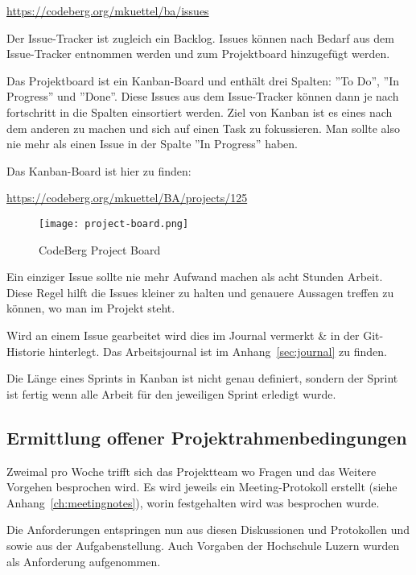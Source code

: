 \url{https://codeberg.org/mkuettel/ba/issues}

Der Issue-Tracker ist zugleich ein Backlog. Issues können nach Bedarf aus dem Issue-Tracker entnommen werden und zum Projektboard hinzugefügt werden.

Das Projektboard ist ein Kanban-Board und enthält drei Spalten: ''To Do'', ''In Progress'' und ''Done''.
Diese Issues aus dem Issue-Tracker können dann je nach fortschritt in die Spalten einsortiert werden. 
Ziel von Kanban ist es eines nach dem anderen zu machen und sich auf einen Task zu fokussieren. Man sollte also nie mehr als einen Issue in der Spalte ''In Progress'' haben.


Das Kanban-Board ist hier zu finden:

\url{https://codeberg.org/mkuettel/BA/projects/125}



\begin{figure*}[ht]
    \texttt{[image: project-board.png]}
    \caption{CodeBerg Project Board}
    \label{fig:projectboard}
\end{figure*}


Ein einziger Issue sollte nie mehr Aufwand machen als acht Stunden Arbeit. Diese Regel hilft die Issues kleiner zu halten und genauere Aussagen treffen zu können, wo man im Projekt steht.

Wird an einem Issue gearbeitet wird dies im Journal vermerkt \& in der Git-Historie hinterlegt.
Das Arbeitsjournal ist im Anhang~\ref{sec:journal} zu finden.


Die Länge eines Sprints in Kanban ist nicht genau definiert, sondern der Sprint ist fertig wenn alle Arbeit für den jeweiligen Sprint erledigt wurde.

\subsection{Ermittlung offener Projektrahmenbedingungen}
\label{sub:RequirementsEngineering}

Zweimal pro Woche trifft sich das Projektteam wo Fragen und das Weitere
Vorgehen besprochen wird. Es wird jeweils ein Meeting-Protokoll erstellt (siehe
Anhang~\ref{ch:meetingnotes}), worin festgehalten wird was besprochen wurde.

Die Anforderungen entspringen nun aus diesen Diskussionen und Protokollen und sowie aus der Aufgabenstellung.
Auch Vorgaben der Hochschule Luzern wurden als Anforderung aufgenommen.


